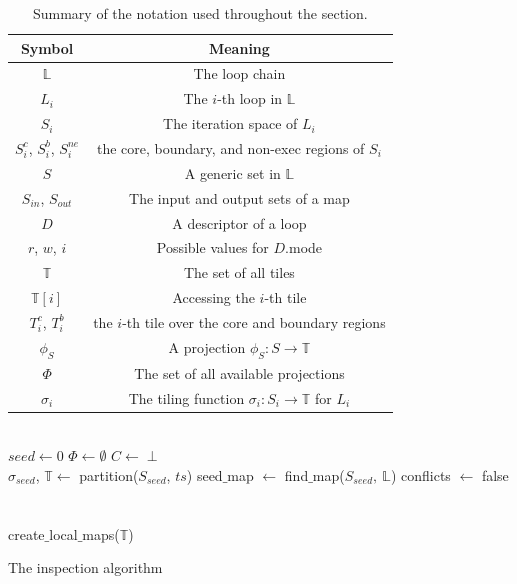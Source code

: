 \begin{table}
\centering
\begin{tabulary}{1.0\columnwidth}{C|C}
\hline
Symbol & Meaning \\
\hline
$\mathbb{L}$ & The loop chain \\
$L_i$ & The $i$-th loop in $\mathbb{L}$ \\ 
$S_i$ & The iteration space of $L_i$ \\
$S_i^{c}$, $S_i^{b}$, $S_i^{ne}$ & the core, boundary, and non-exec regions of $S_i$ \\ 
$S$ & A generic set in $\mathbb{L}$ \\
$S_{in}$, $S_{out}$ & The input and output sets of a map \\
$D$ & A descriptor of a loop \\
$r$, $w$, $i$ & Possible values for $D$.mode \\
$\mathbb{T}$ & The set of all tiles \\
$\mathbb{T}[i]$ & Accessing the $i$-th tile \\
$T_i^{c}$, $T_i^{b}$ & the $i$-th tile over the core and boundary regions \\
$\phi_S$ & A projection $\phi_S : S \rightarrow \mathbb{T}$ \\
$\Phi$ & The set of all available projections \\
$\sigma_i$ & The tiling function $\sigma_i : S_i \rightarrow \mathbb{T}$ for $L_i$ \\
\hline
\end{tabulary}
\caption{Summary of the notation used throughout the section.}
\label{table:st-summary-notation}
\end{table}

\setcounter{algocf}{0}%
\begin{algorithm}[t]
\nonl ~\\
$seed \gets 0$\;
$\Phi \gets \emptyset$\;
$C \gets \perp$\;
\nonl ~\\
$\sigma_{seed}$, $\mathbb{T} \gets$ partition($S_{seed}$, $ts$)\;
seed$\_$map $\gets$ find$\_$map($S_{seed},\ \mathbb{L}$)\;
conflicts $\gets$ false\;
\nonl ~\\
\nonl ~\\
create$\_$local$\_$maps($\mathbb{T}$)\;
\caption{The inspection algorithm}
\label{algo:st-inspector}
\end{algorithm}




